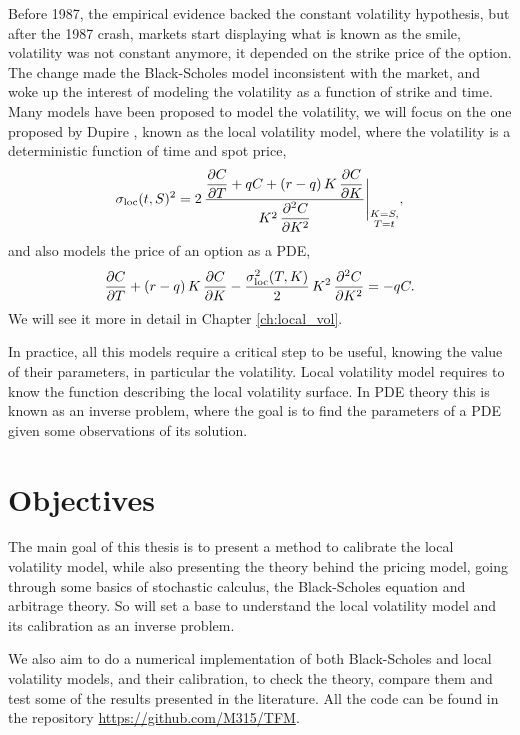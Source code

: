 Before 1987,
the empirical evidence backed the constant volatility hypothesis,
but after the 1987 crash,
markets start displaying what is known as the smile,
volatility was not constant anymore,
it depended on the strike price of the option.
The change made the Black-Scholes model inconsistent with the market,
and woke up the interest of modeling the volatility as a function of strike and time.
Many models have been proposed to model the volatility,
we will focus on the one proposed by Dupire \cite{dupire_pricing_smile},
known as the local volatility model,
where the volatility is a deterministic function of time and spot price,
\begin{equation*}
    \sigma_{\mathrm{loc}}(t, S)^2 = 2\,\frac{
        \dfrac{\partial C}{\partial T} + qC + (r-q)\,K\,\dfrac{\partial C}{\partial K}
    }{
        K^2\,\dfrac{\partial^2 C}{\partial K^2}
    }\Bigg|_{\substack{K = S,\\ T = t}},
\end{equation*}
and also models the price of an option as a PDE,
\begin{equation*}
    \frac{\partial C}{\partial T} + (r-q)\,K\,\frac{\partial C}{\partial K}
    - \frac{\sigma_{\mathrm{loc}}^2(T,K)}{2}\,K^2\,\frac{\partial^2 C}{\partial K^2} = -qC.
\end{equation*}
We will see it more in detail in Chapter \ref{ch:local_vol}.

In practice,
all this models require a critical step to be useful,
knowing the value of their parameters,
in particular the volatility.
Local volatility model requires to know the function describing the local volatility surface.
In PDE theory this is known as an inverse problem,
where the goal is to find the parameters of a PDE given some observations of its solution.

\section{Objectives}

The main goal of this thesis is to present a method to calibrate the local volatility model,
while also presenting the theory behind the pricing model,
going through some basics of stochastic calculus, the Black-Scholes equation and arbitrage theory.
So will set a base to understand the local volatility model and its calibration as an inverse problem.

We also aim to do a numerical implementation of both Black-Scholes and local volatility models,
and their calibration,
to check the theory, compare them and test some of the results presented in the literature.
All the code can be found in the repository \href{https://github.com/M315/TFM}{https://github.com/M315/TFM}.

